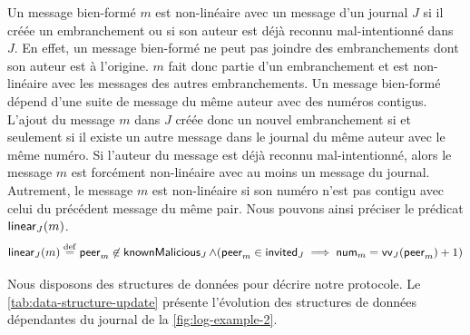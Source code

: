Un message bien-formé $m$ est non-linéaire avec un message d'un journal $J$ si il créée un embranchement ou si son auteur est déjà reconnu mal-intentionné dans $J$.
En effet, un message bien-formé ne peut pas joindre des embranchements dont son auteur est à l'origine.
$m$ fait donc partie d'un embranchement et est non-linéaire avec les messages des autres embranchements.
%
Un message bien-formé dépend d'une suite de message du même auteur avec des numéros contigus.
L'ajout du message $m$ dans $J$ créée donc un nouvel embranchement si et seulement si il existe un autre message dans le journal du même auteur avec le même numéro.
Si l'auteur du message est déjà reconnu mal-intentionné, alors le message $m$ est forcément non-linéaire avec au moins un message du journal.
Autrement, le message $m$ est non-linéaire si son numéro n'est pas contigu avec celui du précédent message du même pair.
Nous pouvons ainsi préciser le prédicat $\operatorname{\mathsf{linear}}_J(m)$.
%
%
\begin{equation*}
\operatorname{\mathsf{linear}}_J(m) \overset{\mathrm{def}}{=}
\operatorname{\mathsf{peer}}_m \not\in \operatorname{\mathsf{knownMalicious}}_J \land (\operatorname{\mathsf{peer}}_m \in \operatorname{\mathsf{invited}}_J \implies \operatorname{\mathsf{num}}_m = \operatorname{\mathsf{vv}}_J(\operatorname{\mathsf{peer}}_m) + 1)
\end{equation*}

Nous disposons des structures de données pour décrire notre protocole.
Le \autoref{tab:data-structure-update} présente l'évolution des structures de données dépendantes du journal de la \autoref{fig:log-example-2}.

